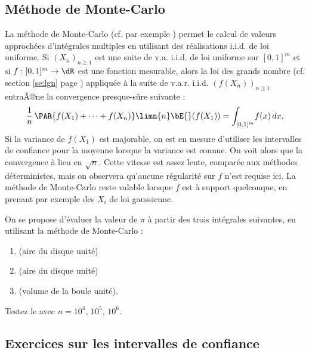 %
\subsection{Méthode de Monte-Carlo}\label{ss:mc}
%

La méthode de Monte-Carlo (cf. par exemple \cite[p. 103]{dacunha-castelle-duflo})
permet le calcul de valeurs approchées d'intégrales multiples en utilisant des
réalisations i.i.d. de loi uniforme. Si $(X_n)_{n\geq 1}$ est une suite de
v.a. i.i.d. de loi uniforme sur $[0,1]^m$ et si $f:[0,1]^m\to\dR$ est une
fonction mesurable, alors la loi des grands nombre (cf. section \ref{se:lgn}
page \pageref{se:lgn}) appliquée à la suite de v.a.r. i.i.d. $(f(X_n))_{n\geq
  1}$ entraÃ®ne la convergence presque-sûre suivante :
$$
\frac{1}{n}\,\PAR{f(X_1)+\cdots+f(X_n)}
\limn{n}
\bE{}(f(X_1))=\int_{[0,1]^m}\! f(x)\,dx,
$$
Si la variance de $f(X_1)$ est majorable, on est en mesure d'utiliser les
intervalles de confiance pour la moyenne lorsque la variance est connue. On
voit alors que la convergence à lieu en $\sqrt{n}$. Cette vitesse est assez
lente, comparée aux méthodes déterministes, mais on observera qu'aucune
régularité sur $f$ n'est requise ici. La méthode de Monte-Carlo reste valable
lorsque $f$ est à support quelconque, en prenant par exemple des $X_i$ de loi
gaussienne.

\begin{xpl}
  On se propose d'évaluer la valeur de $\pi$ à partir des trois intégrales
  suivantes, en utilisant la méthode de Monte-Carlo :
\begin{enumerate}
\item {} \quad (aire du disque unité)
\item {} \quad (aire du disque unité)
\item {} \quad (volume de la boule
  unité).
\end{enumerate}
%
%
Testez le avec $n=10^4$, $10^5$, $10^6$.
%
%
%
\end{xpl}

\subsection{Exercices sur les intervalles de confiance}

